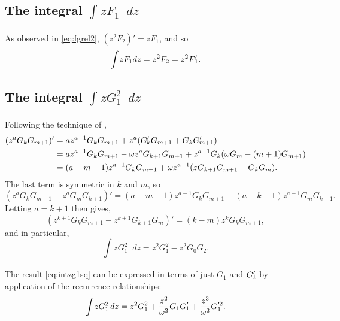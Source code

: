 \documentclass[parskip=half]{scrartcl}
\newcommand{\Int}[2]{\int_{#1}^{#2}\!}
\newcommand{\D}{\mathop{}\!d}
\theoremstyle{nonumberplain}
\begin{document}
\subsection*{The integral $\Int{}{} z F_1 \D z$}

As observed in \eqref{eq:fgrel2}, $(z^2 F_2)' = z F_1$, and so
\begin{equation}
    \Int{}{} z F_1 dz = z^2 F_2 = z^2 \Fp_1.
\end{equation}

\subsection*{The integral $\Int{}{} z G_1^2 \D z$}

Following the technique of \autocite[p.533]{lommel1879},
\begin{equation}
    \begin{aligned}
        (z^a G_k G_{m+1})'
        &= a z^{a-1} G_k G_{m+1} + z^a(\Gp_k G_{m+1} + G_k \Gp_{m+1})\\
        &= a z^{a-1} G_k G_{m+1} - \omega z^a G_{k+1}G_{m+1} + z^{a-1} G_k(\omega G_m - (m+1) G_{m+1})\\
        &= (a-m-1) z^{a-1} G_k G_{m+1} + \omega z^{a-1} (zG_{k+1}G_{m+1} - G_k G_m).
    \end{aligned}
\end{equation}
The last term is symmetric in $k$ and $m$, so
\begin{equation}
    (z^a G_k G_{m+1} - z^a G_m G_{k+1})' =
    (a-m-1) z^{a-1} G_k G_{m+1} - (a-k-1) z^{a-1} G_m G_{k+1}.
\end{equation}
Letting $a=k+1$ then gives,
\begin{equation}
    (z^{k+1} G_k G_{m+1} - z^{k+1} G_{k+1} G_m)' = (k-m) z^k G_k G_{m+1},
\end{equation}
and in particular,
\begin{equation}
    \label{eq:intzg1sq}
    \Int{}{} z G_1^2 \D z = z^2 G_1^2 - z^2 G_0 G_2.
\end{equation}

The result \eqref{eq:intzg1sq} can be expressed in terms of just $G_1$ and $\Gp_1$ by
application of the recurrence relationships:
\begin{equation}
    \label{eq:intzg1sqbis}
    \Int{}{} z G_1^2 \D z = z^2 G_1^2 + \frac{z^2}{\omega^2} G_1 \Gp_1 + \frac{z^3}{\omega^2} G^{\prime 2}_1.
\end{equation}


\printbibliography
\end{document}
